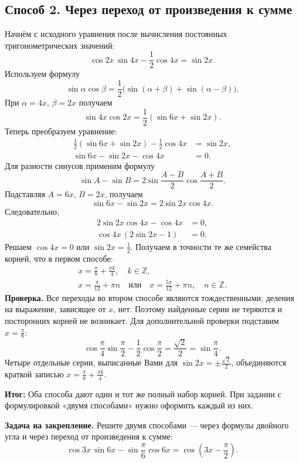 \documentclass[a4paper,11pt]{article}
\newcommand{\resultlabel}{\textcolor{accent}{\textbf{Итог:}}}
\begin{document}
\subsection*{Способ 2. Через переход от произведения к сумме}
Начнём с исходного уравнения после вычисления постоянных тригонометрических значений:
\[
\cos 2x\,\sin 4x-\frac12\cos 4x=\sin 2x.
\]
Используем формулу
\[
\sin\alpha\cos\beta
=\frac12\bigl(\sin(\alpha+\beta)+\sin(\alpha-\beta)\bigr).
\]
При \(\alpha=4x\), \(\beta=2x\) получаем
\[
\sin 4x\cos 2x=\frac12(\sin 6x+\sin 2x).
\]
Теперь преобразуем уравнение:
\begin{align*}
\frac12(\sin 6x+\sin 2x)-\frac12\cos 4x&=\sin 2x,\\
\sin 6x-\sin 2x-\cos 4x&=0.
\end{align*}
Для разности синусов применим формулу
\[
\sin A-\sin B
=2\sin\frac{A-B}{2}\cos\frac{A+B}{2}.
\]
Подставляя \(A=6x\), \(B=2x\), получаем
\[
\sin 6x-\sin 2x=2\sin 2x\cos 4x.
\]
Следовательно,
\begin{align*}
2\sin 2x\cos 4x-\cos 4x&=0,\\
\boxed{\cos 4x\,(2\sin 2x-1)}&\boxed{=0}.
\end{align*}
Решаем \(\cos 4x=0\) или \(\sin 2x=\tfrac12\). Получаем в точности те же семейства корней, что в первом способе:
\[
\boxed{\begin{gathered}
x=\frac\pi8+\frac{\pi k}4,\quad k\in\mathbb Z,\\[4pt]
x=\frac\pi{12}+\pi n\quad\text{или}\quad
x=\frac{5\pi}{12}+\pi n,\quad n\in\mathbb Z.
\end{gathered}}
\]
\textbf{Проверка.} Все переходы во втором способе являются тождественными; деления на выражение, зависящее от \(x\), нет. Поэтому найденные серии не теряются и посторонних корней не возникает. Для дополнительной проверки подставим \(x=\frac\pi8\):
\[
\cos\frac\pi4\sin\frac\pi2-\frac12\cos\frac\pi2
=\frac{\sqrt2}{2}
=\sin\frac\pi4.
\]
Четыре отдельные серии, выписанные Вами для \(\sin 2x=\pm\frac{\sqrt2}2\), объединяются краткой записью \(x=\frac\pi8+\frac{\pi k}4\).

\resultlabel{} Оба способа дают один и тот же полный набор корней. При задании с формулировкой «двумя способами» нужно оформить каждый из них.

\textbf{Задача на закрепление.} Решите двумя способами --- через формулы двойного угла и через переход от произведения к сумме:
\[
\cos 3x\,\sin 6x-\sin\frac\pi6\cos 6x
=\cos\left(3x-\frac\pi2\right).
\]
\end{document}
